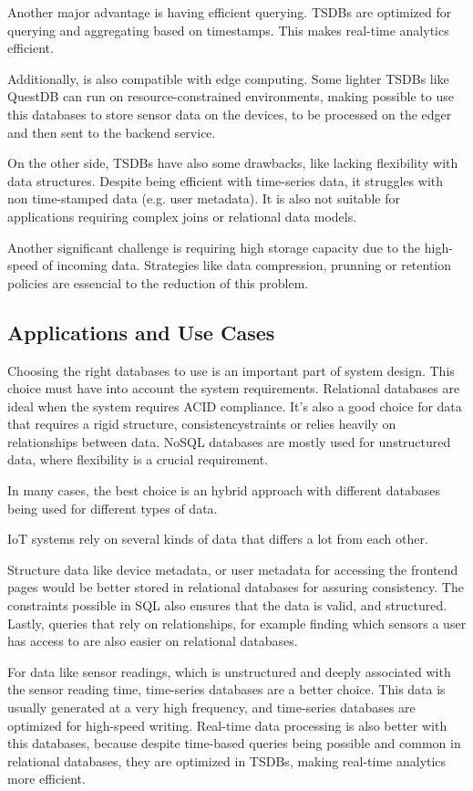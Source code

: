 Another major advantage is having efficient querying. \gls{TSDB}s are optimized
for querying and aggregating based on timestamps. This makes real-time analytics
efficient\cite{InfluxDB}.

Additionally, is also compatible with edge computing.
Some lighter \gls{TSDB}s like QuestDB can run on resource-constrained environments,
making possible to use this databases to store sensor data on the devices,
to be processed on the edger and then sent to the backend service.


On the other side, \gls{TSDB}s have also some drawbacks, like lacking flexibility
with data structures.
Despite being efficient with time-series data, it struggles with non
time-stamped data (e.g. user metadata). It is also not suitable for applications requiring
complex joins or relational data models.

Another significant challenge is requiring high storage capacity due to the
high-speed of incoming data.
Strategies like data compression, prunning or retention policies
are essencial to the reduction of this problem.

\subsection{Applications and Use Cases}
Choosing the right databases to use is an important part of system design. This
choice must have into account the system requirements. Relational databases are
ideal when the system requires \gls{ACID} compliance. It's also a good choice for
data that requires a rigid structure, consistencystraints or relies heavily on
relationships between data. \gls{NoSQL} databases are mostly used for unstructured
data, where flexibility is a crucial requirement.

In many cases, the best choice is an hybrid approach with different databases
being used for different types of data.

\gls{IoT} systems rely on several kinds of data that differs a lot from each other.

Structure data like device metadata, or user metadata for accessing the
frontend pages would be better stored in relational databases for assuring
consistency. The constraints possible in \gls{SQL} also ensures that the data is valid,
and structured. Lastly, queries that rely on relationships, for example finding
which sensors a user has access to are also easier on relational databases.

For data like sensor readings, which is unstructured and deeply associated with
the sensor reading time, time-series databases are a better choice. This data
is usually generated at a very high frequency, and time-series databases are
optimized for high-speed writing. Real-time data processing is also better with
this databases, because despite time-based queries being possible and common in
relational databases, they are optimized in \gls{TSDB}s, making
real-time analytics more efficient.

